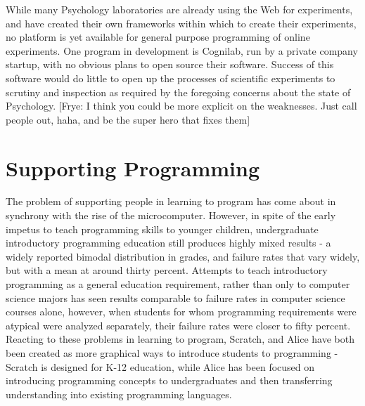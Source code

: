 \documentclass[12pt,a4paper,titlepage]{scrreprt}
\begin{document}
While many Psychology laboratories are already using the Web for experiments, and have created their own frameworks within which to create their experiments\cite{krantz_comparing_1997,germine_is_2012}, no platform is yet available for general purpose programming of online experiments. One program in development is Cognilab\cite{_cognilab_????}, run by a private company startup, with no obvious plans to open source their software. Success of this software would do little to open up the processes of scientific experiments to scrutiny and inspection as required by the foregoing concerns about the state of Psychology.
[Frye: I think you could be more explicit on the weaknesses. Just call people out, haha, and be the super hero that fixes them]
\section{Supporting Programming}
The problem of supporting people in learning to program has come about in synchrony with the rise of the microcomputer\cite{papert_teaching_1971,papert_teaching_1971_1,papert_computer_1971,papert_twenty_1971,papert_making_1972}. However, in spite of the early impetus to teach programming skills to younger children, undergraduate introductory programming education still produces highly mixed results - a widely reported bimodal distribution in grades\cite{dehnadi_camel_2006}\cite{robins_learning_2010}, and failure rates that vary widely\cite{bennedsen_failure_2007}, but with a mean at around thirty percent. Attempts to teach introductory programming as a general education requirement, rather than only to computer science majors has seen results comparable to failure rates in computer science courses alone\cite{guzdial_education:_2009}, however, when students for whom programming requirements were atypical were analyzed separately, their failure rates were closer to fifty percent. Reacting to these problems in learning to program, Scratch\cite{maloney_scratch:_2004}, and Alice\cite{moskal_evaluating_2004} have both been created as more graphical ways to introduce students to programming - Scratch is designed for K-12 education\cite{malan_scratch_2007}, while Alice has been focused on introducing programming concepts to undergraduates and then transferring understanding into existing programming languages\cite{dann_mediated_2012}.
\end{document}
